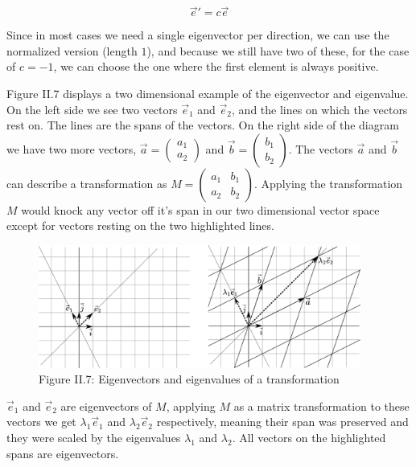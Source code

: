 \[\vec e' = c \vec e\]

Since in most cases we need a single eigenvector per direction, we can use the normalized version (length \(1\)), and because we still have two of these, for the case of \(c = -1\), we can choose the one where the first element is always positive.

Figure II.7 displays a two dimensional example of the eigenvector and eigenvalue. On the left side we see two vectors \(\vec e_1\) and \(\vec e_2\), and the lines on which the vectors rest on. The lines are the spans of the vectors. On the right side of the diagram we have two more vectors, \(\vec a = \begin{pmatrix} a_1 \\ a_2 \end{pmatrix}\) and \(\vec b = \begin{pmatrix} b_1 \\ b_2 \end{pmatrix}\). The vectors \(\vec a\) and \(\vec b\) can describe a transformation as \(M = \begin{pmatrix}a_{1} & b_{1} \\ a_{2} & b_{2}\end{pmatrix}\). Applying the transformation \(M\) would knock any vector off it's span in our two dimensional vector space except for vectors resting on the two highlighted lines.


\begin{figure}[htbp]
    \begin{center}
        \includegraphics[width=300pt]{../img/ii-eigen.png}
        \caption{Figure II.7: Eigenvectors and eigenvalues of a transformation}
    \end{center}
\end{figure}


\(\vec e_1\) and \(\vec e_2\) are eigenvectors of \(M\), applying \(M\) as a matrix transformation to these vectors we get \(\lambda_1 \vec e_1\) and \(\lambda_2 \vec e_2\) respectively, meaning their span was preserved and they were scaled by the eigenvalues \(\lambda_1\) and \(\lambda_2\). All vectors on the highlighted spans are eigenvectors.

